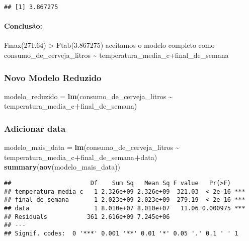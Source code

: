 \documentclass[
]{article}
\newenvironment{Shaded}{\begin{snugshade}}{\end{snugshade}}
\newcommand{\FunctionTok}[1]{\textcolor[rgb]{0.13,0.29,0.53}{\textbf{#1}}}
\newcommand{\NormalTok}[1]{#1}
\newcommand{\OtherTok}[1]{\textcolor[rgb]{0.56,0.35,0.01}{#1}}
\newcommand{\SpecialCharTok}[1]{\textcolor[rgb]{0.81,0.36,0.00}{\textbf{#1}}}
\begin{document}
\begin{verbatim}
## [1] 3.867275
\end{verbatim}

\hypertarget{conclusuxe3o-4}{%
\paragraph{Conclusão:}\label{conclusuxe3o-4}}

Fmax(271.64) \textgreater{} Ftab(3.867275) aceitamos o modelo completo
como consumo\_de\_cerveja\_litros \textasciitilde{}
temperatura\_media\_c+final\_de\_semana

\hypertarget{novo-modelo-reduzido}{%
\subsubsection{Novo Modelo Reduzido}\label{novo-modelo-reduzido}}

\begin{Shaded}
\begin{Highlighting}[]
\NormalTok{modelo\_reduzido }\OtherTok{=} \FunctionTok{lm}\NormalTok{(consumo\_de\_cerveja\_litros }\SpecialCharTok{\textasciitilde{}} 
\NormalTok{                       temperatura\_media\_c}\SpecialCharTok{+}\NormalTok{final\_de\_semana)}
\end{Highlighting}
\end{Shaded}

\hypertarget{adicionar-data-1}{%
\subsubsection{Adicionar data}\label{adicionar-data-1}}

\begin{Shaded}
\begin{Highlighting}[]
\NormalTok{modelo\_mais\_data }\OtherTok{=} \FunctionTok{lm}\NormalTok{(consumo\_de\_cerveja\_litros }\SpecialCharTok{\textasciitilde{}} 
\NormalTok{                        temperatura\_media\_c}\SpecialCharTok{+}\NormalTok{final\_de\_semana}\SpecialCharTok{+}\NormalTok{data)}
\FunctionTok{summary}\NormalTok{(}\FunctionTok{aov}\NormalTok{(modelo\_mais\_data))}
\end{Highlighting}
\end{Shaded}

\begin{verbatim}
##                      Df    Sum Sq   Mean Sq F value   Pr(>F)    
## temperatura_media_c   1 2.326e+09 2.326e+09  321.03  < 2e-16 ***
## final_de_semana       1 2.023e+09 2.023e+09  279.19  < 2e-16 ***
## data                  1 8.010e+07 8.010e+07   11.06 0.000975 ***
## Residuals           361 2.616e+09 7.245e+06                     
## ---
## Signif. codes:  0 '***' 0.001 '**' 0.01 '*' 0.05 '.' 0.1 ' ' 1
\end{verbatim}
\end{document}
